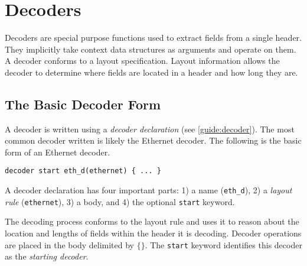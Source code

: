 \section{Decoders} \label{tut:decoder}

Decoders are special purpose functions
used to extract fields from a single header. 
They implicitly take context data structures as arguments and 
operate on them.
A decoder conforms to a layout specification.
Layout information allows the decoder to determine where fields
are located in a header and how long they are.


%
%
%
%

\subsection{The Basic Decoder Form} \label{tut:basic_decoder}

A decoder is written using a \textit{decoder declaration} (see \ref{guide:decoder}).
The most common decoder written is likely the Ethernet decoder. The following
is the basic form of an Ethernet decoder.

\begin{lstlisting}
decoder start eth_d(ethernet) { ... }
\end{lstlisting}

A decoder declaration has four important parts: 
1) a name (\texttt{eth\_d}), 
2) a \textit{layout rule} (\texttt{ethernet}),
3) a body, and
4) the optional \texttt{start} keyword.

The decoding process conforms to the layout rule and uses it to reason
about the location and lengths of fields within the header it is decoding.
Decoder operations are placed in the body delimited by $\lbrace\rbrace$.
The \texttt{start} keyword identifies this decoder as the \emph{starting
decoder}. 

